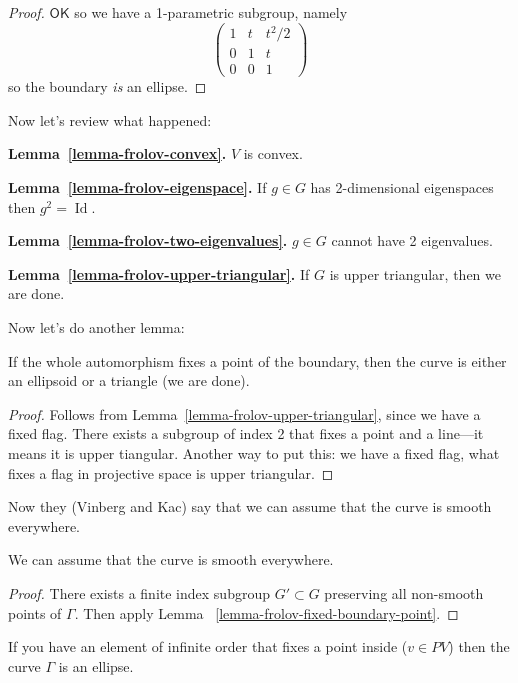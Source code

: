 \begin{proof}
$\mathsf{OK}$ so we have a 1-parametric
subgroup, namely
$$\begin{pmatrix} 1 & t & t^2/2\\ 0 & 1 & t\\
0 & 0 & 1 \end{pmatrix}$$
so the boundary \textit{is} an ellipse.
\end{proof}

Now let's review what happened:

{\bf Lemma~\ref{lemma-frolov-convex}.}
$V$ is convex.

{\bf Lemma~\ref{lemma-frolov-eigenspace}.}
If $g \in G$ has 2-dimensional eigenspaces
then $g^2=\operatorname{Id}$.

{\bf
Lemma~\ref{lemma-frolov-two-eigenvalues}.}
$g \in G$ cannot have 2 eigenvalues.

{\bf
Lemma~\ref{lemma-frolov-upper-triangular}.}
If $G$ is upper triangular, then we are done.

Now let's do another lemma:

\begin{lemma}
\label{lemma-frolov-fixed-boundary-point}
If the whole automorphism fixes a point of
the boundary, then the curve is either an
ellipsoid or a triangle (we are done).
\end{lemma}

\begin{proof}
Follows from
Lemma~\ref{lemma-frolov-upper-triangular},
since we have a fixed flag. There exists a
subgroup of index 2 that fixes a point and a
line---it means it is upper tiangular.
Another way to put this: we have a fixed
flag, what fixes a flag in projective space
is upper triangular.
\end{proof}

Now they (Vinberg and Kac) say that we can
assume that the curve is smooth everywhere.

\begin{lemma}
\label{lemma-frolov-smooth}
We can assume that the curve is smooth
everywhere.
\end{lemma}

\begin{proof}
There exists a finite index subgroup
$G'\subset G$ preserving all non-smooth
points of $\Gamma$. Then apply
Lemma~%
\ref{lemma-frolov-fixed-boundary-point}.
\end{proof}

\begin{lemma}
\label{lemma-frolov-infinite-order}
If you have an element of infinite order that
fixes a point inside ($v\in PV$) then the
curve $\Gamma$ is an ellipse.
\end{lemma}

